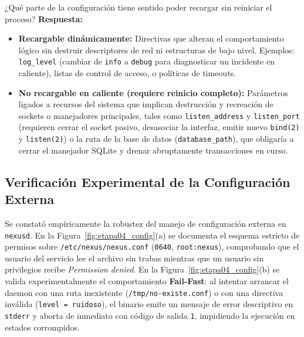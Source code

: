 \documentclass[10pt,a4paper]{article}
\begin{document}
\begin{pregunta}{¿Qué parte de la configuración tiene sentido poder recargar sin reiniciar el proceso?}
    \textbf{Respuesta:}
    \begin{itemize}[leftmargin=*]
        \item \textbf{Recargable dinámicamente:} Directivas que alteran el comportamiento lógico sin destruir descriptores de red ni estructuras de bajo nivel. Ejemplos: \texttt{log\_level} (cambiar de \texttt{info} a \texttt{debug} para diagnosticar un incidente en caliente), listas de control de acceso, o políticas de timeouts.
        \item \textbf{No recargable en caliente (requiere reinicio completo):} Parámetros ligados a recursos del sistema que implican destrucción y recreación de sockets o manejadores principales, tales como \texttt{listen\_address} y \texttt{listen\_port} (requieren cerrar el socket pasivo, desasociar la interfaz, emitir nuevo \texttt{bind(2)} y \texttt{listen(2)}) o la ruta de la base de datos (\texttt{database\_path}), que obligaría a cerrar el manejador SQLite y drenar abruptamente transacciones en curso.
    \end{itemize}
\end{pregunta}

\subsection{Verificación Experimental de la Configuración Externa}

Se constató empíricamente la robustez del manejo de configuración externa en \texttt{nexusd}. En la Figura~\ref{fig:etapa04_config}(a) se documenta el esquema estricto de permisos sobre \texttt{/etc/nexus/nexus.conf} (\texttt{0640}, \texttt{root:nexus}), comprobando que el usuario del servicio lee el archivo sin trabas mientras que un usuario sin privilegios recibe \textit{Permission denied}. En la Figura~\ref{fig:etapa04_config}(b) se valida experimentalmente el comportamiento \textbf{Fail-Fast}: al intentar arrancar el daemon con una ruta inexistente (\texttt{/tmp/no-existe.conf}) o con una directiva inválida (\texttt{level = ruidoso}), el binario emite un mensaje de error descriptivo en \texttt{stderr} y aborta de inmediato con código de salida \texttt{1}, impidiendo la ejecución en estados corrompidos.
\end{document}
